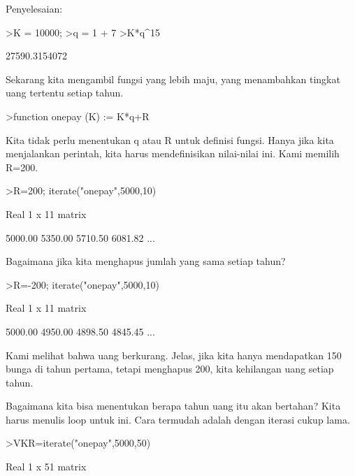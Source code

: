 \documentclass{article}
\begin{document}
\begin{eulernotebook}
\begin{eulercomment}
\begin{eulercomment}
\begin{eulercomment}
\begin{eulercomment}
\begin{eulercomment}
Penyelesaian:
\end{eulercomment}
\begin{eulerprompt}
>K = 10000;
>q = 1 + 7%
>K*q^15
\end{eulerprompt}
\begin{euleroutput}
  27590.3154072
\end{euleroutput}
\begin{eulercomment}
\begin{eulercomment}
\begin{eulercomment}
Sekarang kita mengambil fungsi yang lebih maju, yang menambahkan
tingkat uang tertentu setiap tahun.
\end{eulercomment}
\begin{eulerprompt}
>function onepay (K) := K*q+R
\end{eulerprompt}
\begin{eulercomment}
Kita tidak perlu menentukan q atau R untuk definisi fungsi. Hanya jika
kita menjalankan perintah, kita harus mendefinisikan nilai-nilai ini.
Kami memilih R=200.
\end{eulercomment}
\begin{eulerprompt}
>R=200; iterate("onepay",5000,10)
\end{eulerprompt}
\begin{euleroutput}
  Real 1 x 11 matrix
  
      5000.00     5350.00     5710.50     6081.82     ...
\end{euleroutput}
\begin{eulercomment}
Bagaimana jika kita menghapus jumlah yang sama setiap tahun?
\end{eulercomment}
\begin{eulerprompt}
>R=-200; iterate("onepay",5000,10)
\end{eulerprompt}
\begin{euleroutput}
  Real 1 x 11 matrix
  
      5000.00     4950.00     4898.50     4845.45     ...
\end{euleroutput}
\begin{eulercomment}
Kami melihat bahwa uang berkurang. Jelas, jika kita hanya mendapatkan
150 bunga di tahun pertama, tetapi menghapus 200, kita kehilangan uang
setiap tahun.

Bagaimana kita bisa menentukan berapa tahun uang itu akan bertahan?
Kita harus menulis loop untuk ini. Cara termudah adalah dengan iterasi
cukup lama.
\end{eulercomment}
\begin{eulerprompt}
>VKR=iterate("onepay",5000,50)
\end{eulerprompt}
\begin{euleroutput}
  Real 1 x 51 matrix
  

\end{euleroutput}
\end{eulercomment}
\end{eulercomment}
\end{eulercomment}
\end{eulercomment}
\end{eulercomment}
\end{eulercomment}
\end{eulernotebook}
\end{document}
